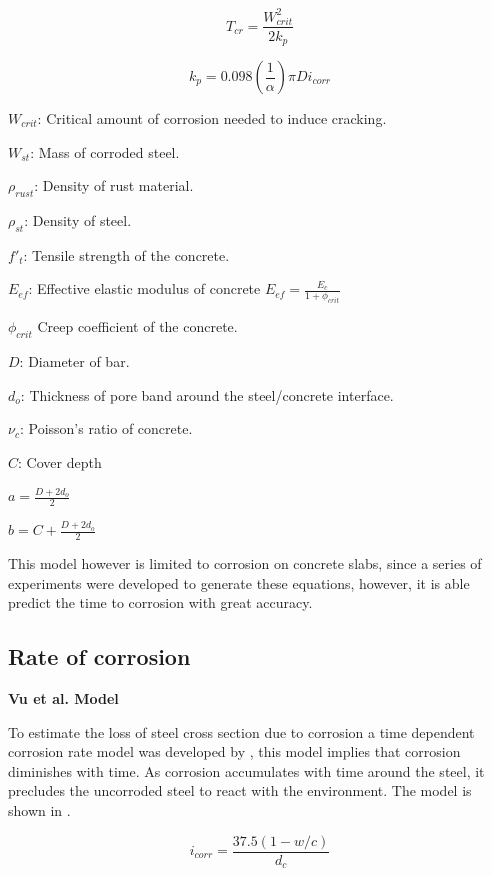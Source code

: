 \begin{equation}
  T_{cr}=\frac{W_{crit}^2}{2k_p}
  \label{eq.five}
\end{equation} 

\begin{equation}
  k_p=0.098 (\frac{1}{\alpha})\pi Di_{corr}
  \label{eq.six}
\end{equation} 

$W_{crit}$: Critical amount of corrosion needed to induce cracking.

$W_{st}$: Mass of corroded steel.

$\rho_{rust}$: Density of rust material.

$\rho_{st}$: Density of steel.

$f'_t$: Tensile strength of the concrete. 

$E_{ef}$: Effective elastic modulus of concrete $E_{ef}=\frac{E_c}{1+\phi_{crit}}$ 

$\phi_{crit}$ Creep coefficient of the concrete.

$D$: Diameter of bar.

$d_o$: Thickness of pore band around the steel/concrete interface.

$\nu_c$: Poisson's ratio of concrete.

$C$: Cover depth

$a=\frac{D+2d_o}{2}$

$b=C+\frac{D+2d_o}{2}$

This model however is limited to corrosion on concrete slabs, since a series of experiments were developed to generate these equations, however, it is able predict the time to corrosion with great accuracy.

\subsection{Rate of corrosion}

\textbf{Vu et al. Model }
\newline

To estimate the loss of steel cross section due to corrosion a time dependent corrosion rate model was developed by \cite{Vu2000}, this model implies that corrosion diminishes with time. As corrosion accumulates with time around the steel, it precludes the uncorroded steel to react with the environment. The model is shown in .

\begin{equation}
  i_{corr}=\frac{37.5(1-w/c)}{d_c}
  \label{eq.eight}
\end{equation} 


